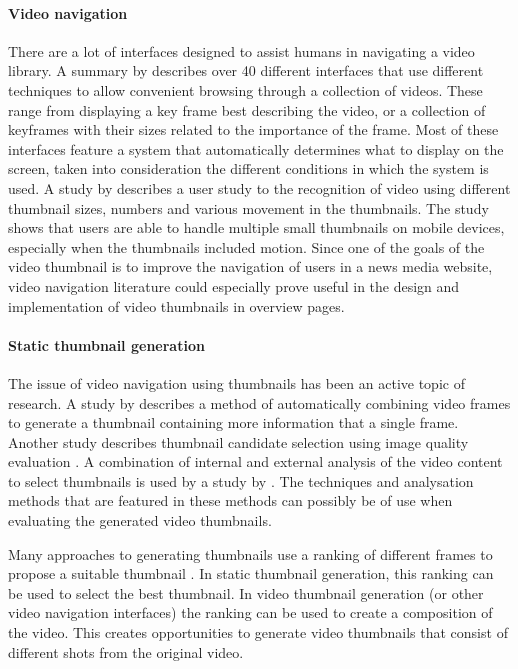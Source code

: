 \documentclass{../resources/sig-alternate-05-2015}
\begin{document}
\paragraph{Video navigation}
\label{section: video navigation}
There are a lot of interfaces designed to assist humans in navigating a video library. A summary by \textcite{Schoeffmann:2010iw} describes over 40 different interfaces that use different techniques to allow convenient browsing through a collection of videos. These range from displaying a key frame best describing the video, or a collection of keyframes with their sizes related to the importance of the frame. Most of these interfaces feature a system that automatically determines what to display on the screen, taken into consideration the different conditions in which the system is used. A study by \textcite{Hurst:2011jx} describes a user study to the recognition of video using different thumbnail sizes, numbers and various movement in the thumbnails. The study shows that users are able to handle multiple small thumbnails on mobile devices, especially when the thumbnails included motion. Since one of the goals of the video thumbnail is to improve the navigation of users in a news media website, video navigation literature could especially prove useful in the design and implementation of video thumbnails in overview pages.

\paragraph{Static thumbnail generation}
\label{section: static thumbnails}
The issue of video navigation using thumbnails has been an active topic of research. A \citeyear{Kim:2015co} study by \textcite{Kim:2015co} describes a method of automatically combining video frames to generate a thumbnail containing more information that a single frame. Another study describes thumbnail candidate selection using image quality evaluation \cite{Zhang:2014jg}. A combination of internal and external analysis of the video content to select thumbnails is used by a study by \textcite{Liu:2015ux}. The techniques and analysation methods that are featured in these methods can possibly be of use when evaluating the generated video thumbnails.

Many approaches to generating thumbnails use a ranking of different frames to propose a suitable thumbnail \cite{Choi:2015gm,Zhang:2012eo,Gao:2009dx}. In static thumbnail generation, this ranking can be used to select the best thumbnail. In video thumbnail generation (or other video navigation interfaces) the ranking can be used to create a composition of the video. This creates opportunities to generate video thumbnails that consist of different shots from the original video.
\end{document}
